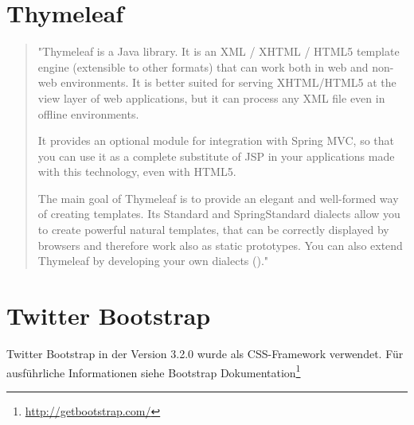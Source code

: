 \section{Thymeleaf}\label{s_thymeleaf}
  \begin{quote}
 "Thymeleaf is a Java library. It is an XML / XHTML / HTML5 template engine (extensible to other formats) that can work both in web and non-web environments. It is better suited for serving XHTML/HTML5 at the view layer of web applications, but it can process any XML file even in offline environments.

It provides an optional module for integration with Spring MVC, so that you can use it as a complete substitute of JSP in your applications made with this technology, even with HTML5.

The main goal of Thymeleaf is to provide an elegant and well-formed way of creating templates. Its Standard and SpringStandard dialects allow you to create powerful natural templates, that can be correctly displayed by browsers and therefore work also as static prototypes. You can also extend Thymeleaf by developing your own dialects (\cite{thymeleaf})." 
  \end{quote}

\section{Twitter Bootstrap}\label{s_bootstrap}
Twitter Bootstrap in der Version 3.2.0 wurde als CSS-Framework verwendet. Für ausführliche Informationen siehe Bootstrap Dokumentation\footnote{\url{http://getbootstrap.com/}}